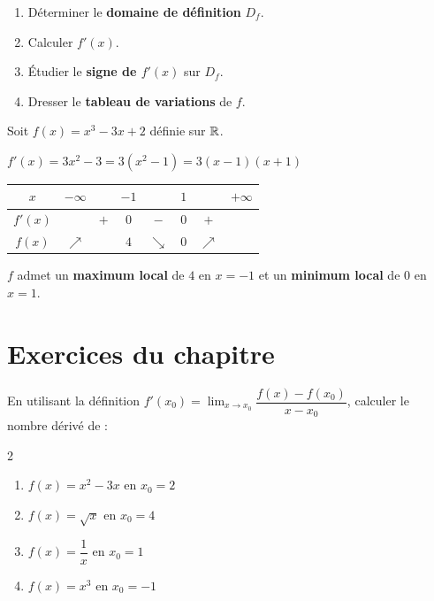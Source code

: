 \begin{methode}
  \begin{enumerate}
    \item D\'{e}terminer le \textbf{domaine de d\'{e}finition} $D_f$.
    \item Calculer $f'(x)$.
    \item \'{E}tudier le \textbf{signe de $f'(x)$} sur $D_f$.
    \item Dresser le \textbf{tableau de variations} de $f$.
  \end{enumerate}
\end{methode}

\begin{exemple}
  Soit $f(x) = x^3 - 3x + 2$ d\'{e}finie sur $\mathbb{R}$.

  \medskip
  $f'(x) = 3x^2 - 3 = 3(x^2-1) = 3(x-1)(x+1)$

  \medskip
  \begin{center}
  \renewcommand{\arraystretch}{1.8}
  \begin{tabular}{|c|ccccccc|}
    \hline
    $x$ & $-\infty$ && $-1$ && $1$ && $+\infty$ \\
    \hline
    $f'(x)$ && $+$ & $0$ & $-$ & $0$ & $+$ & \\
    \hline
    $f(x)$ & $\nearrow$ && $4$ & $\searrow$ & $0$ & $\nearrow$ & \\
    \hline
  \end{tabular}
  \end{center}

  \medskip
  $f$ admet un \textbf{maximum local} de $4$ en $x = -1$
  et un \textbf{minimum local} de $0$ en $x = 1$.
\end{exemple}

\section*{Exercices du chapitre}

\begin{exercice}
  En utilisant la d\'{e}finition $f'(x_0) = \displaystyle\lim_{x \to x_0}
  \dfrac{f(x)-f(x_0)}{x-x_0}$, calculer le nombre d\'{e}riv\'{e} de :
  \begin{multicols}{2}
  \begin{enumerate}
    \item $f(x) = x^2 - 3x$ en $x_0 = 2$
    \item $f(x) = \sqrt{x}$ en $x_0 = 4$
    \item $f(x) = \dfrac{1}{x}$ en $x_0 = 1$
    \item $f(x) = x^3$ en $x_0 = -1$
  \end{enumerate}
  \end{multicols}
\end{exercice}

